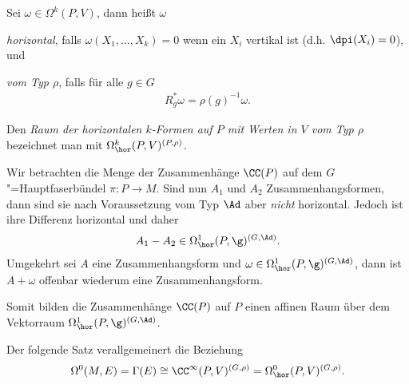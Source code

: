 \documentclass[%
	paper=a5,%
	fleqn,%
	DIV=18,%
	BCOR=0mm,
	fontsize=11pt,
	titlepage=false,%
	bibliography=totoc,
	DIV=18,%
	twoside=true,
	pdftitle=Riemannsche Geometrie,
	pdfauthor=Uwe Semmelmann,
	numbers=noendperiod]%
	{scrbook}
\begin{document}
\begin{defn}
Sei $\omega\in \Omega^k(P,V)$, dann heißt $\omega$
\begin{defnenum}
\item \emph{horizontal}, falls $\omega(X_1,\ldots,X_k) = 0$ wenn ein $X_i$
vertikal ist (d.h. $\dpi(X_i) = 0$), und
\item \emph{vom Typ $\rho$}, falls für alle $g\in G$
\begin{align*}
R_g^* \omega = \rho(g)^{-1}\omega.
\end{align*}
\end{defnenum}
Den \emph{Raum der horizontalen $k$-Formen auf $P$ mit Werten in $V$ vom Typ
$\rho$} bezeichnet man mit $\Omega^k_\hor(P,V)^{(P,\rho)}$.\fish
\end{defn}

\begin{ex}
Wir betrachten die Menge der Zusammenhänge $\CC(P)$ auf dem
$G$"=Hauptfaserbündel $\pi: P\to M$. Sind nun $A_1$ und $A_2$
Zusammenhangsformen, dann sind sie nach Voraussetzung vom Typ $\Ad$ aber
\textit{nicht} horizontal. Jedoch ist ihre Differenz horizontal und daher
\begin{align*}
A_1-A_2 \in \Omega^1_\hor(P,\g)^{(G,\Ad)}.
\end{align*}
Umgekehrt sei $A$ eine Zusammenhangsform und
$\omega\in\Omega_\hor^1(P,\g)^{(G,\Ad)}$, dann ist $A+\omega$ offenbar wiederum
eine Zusammenhangsform.

Somit bilden die Zusammenhänge $\CC(P)$ auf $P$ einen affinen Raum über dem
Vektorraum $\Omega_\hor^1(P,\g)^{(G,\Ad)}$.\bsp
\end{ex}

Der folgende Satz verallgemeinert die Beziehung
\begin{align*}
\Omega^0(M,E) = \Gamma(E)\cong \CC^\infty(P,V)^{(G,\rho)} = \Omega_\hor^0(P,V)^{(G,\rho)}.
\end{align*}
\end{document}
